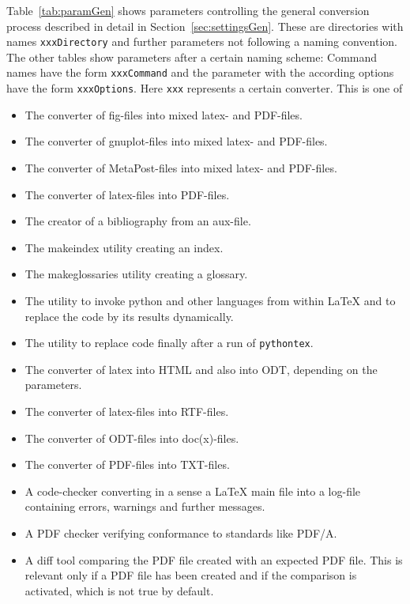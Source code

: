 Table~\ref{tab:paramGen} 
shows parameters controlling the general conversion process 
described in detail in Section~\ref{sec:settingsGen}. 
These are directories with names \texttt{xxxDirectory} 
and further parameters not following a naming convention. 
The other tables show parameters after a certain naming scheme: 
Command names have the form \texttt{xxxCommand} 
and the parameter with the according options have the form \texttt{xxxOptions}. 
Here \texttt{xxx} represents a certain converter. 
This is one of 
%
\begin{itemize}
\item[fig2dev]
The converter of fig-files into mixed latex- and PDF-files. 
\item[gnuplot]
The converter of gnuplot-files into mixed latex- and PDF-files. 
\item[metapost]
The converter of MetaPost-files into mixed latex- and PDF-files.
\item[latex2pdf]
The converter of latex-files into PDF-files. 
\item[bibtex]
The creator of a bibliography from an aux-file.
\item[makeindex]
The makeindex utility creating an index. 
\item[makeglossaries]
The makeglossaries utility creating a glossary. 
\item[pythontex]
The utility to invoke python and other languages from within \LaTeX{} 
and to replace the code by its results dynamically. 
\item[depythontex]
The utility to replace code finally after a run of \texttt{pythontex}. 
\item[tex4ht]
The converter of latex into HTML and also into ODT, 
depending on the parameters. 
\item[latex2rtf]
The converter of latex-files into RTF-files. 
\item[odt2doc]
The converter of ODT-files into doc(x)-files. %
\item[pdf2txt]
The converter of PDF-files into TXT-files. 
\item[chktex]
A code-checker converting in a sense a \LaTeX{} main file into a log-file 
containing errors, warnings and further messages. 
\item[verifyPdf]
A PDF checker verifying conformance to standards like PDF/A. 
\item[diffPdf]
A diff tool comparing the PDF file created with an expected PDF file. 
This is relevant only if a PDF file has been created 
and if the comparison is activated, which is not true by default. 
\end{itemize}

